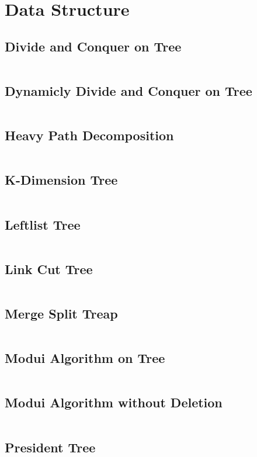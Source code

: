 \documentclass[a4paper,openany]{book}
\newcommand{\cppcode}[1]
{
  \inputminted[mathescape,
  tabsize=4,
  linenos,
  framesep=2mm,
  breakaftergroup=true,
  breakautoindent=true,
  breakbytoken=true,
  breaklines=true,
  fontsize=\small
  ]{cpp}{source/#1}
}
\begin{document}
\chapter{Data Structure}
\section{Divide and Conquer on Tree}
\cppcode{/Data Structure/Divide and Conquer on Tree.cpp}
\section{Dynamicly Divide and Conquer on Tree}
\cppcode{/Data Structure/Dynamicly Divide and Conquer on Tree.cpp}
\section{Heavy Path Decomposition}
\cppcode{/Data Structure/Heavy Path Decomposition.cpp}
\section{K-Dimension Tree}
\cppcode{/Data Structure/K-Dimension Tree.cpp}
\section{Leftlist Tree}
\cppcode{/Data Structure/Leftlist Tree.cpp}
\section{Link Cut Tree}
\cppcode{/Data Structure/Link Cut Tree.cpp}
\section{Merge Split Treap}
\cppcode{/Data Structure/Merge Split Treap.cpp}
\section{Modui Algorithm on Tree}
\cppcode{/Data Structure/Modui Algorithm on Tree.cpp}
\section{Modui Algorithm without Deletion}
\cppcode{/Data Structure/Modui Algorithm without Deletion.cpp}
\section{President Tree}
\cppcode{/Data Structure/President Tree.cpp}
\end{document}
